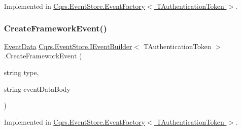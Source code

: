 Implemented in \hyperlink{classCqrs_1_1EventStore_1_1EventFactory_a91394437675f3185d2105c6a79f7b5aa}{Cqrs.\+Event\+Store.\+Event\+Factory$<$ T\+Authentication\+Token $>$}.

\mbox{\label{interfaceCqrs_1_1EventStore_1_1IEventBuilder_a8e3df7af1f54ac873d1a768b78b82c6d}} 
\subsubsection{\texorpdfstring{Create\+Framework\+Event()}{CreateFrameworkEvent()}\hspace{0.1cm}{\footnotesize\ttfamily [4/4]}}
{\footnotesize\ttfamily \hyperlink{classCqrs_1_1Events_1_1EventData}{Event\+Data} \hyperlink{interfaceCqrs_1_1EventStore_1_1IEventBuilder}{Cqrs.\+Event\+Store.\+I\+Event\+Builder}$<$ T\+Authentication\+Token $>$.Create\+Framework\+Event (\begin{DoxyParamCaption}\item[{string}]{type,  }\item[{string}]{event\+Data\+Body }\end{DoxyParamCaption})}



Implemented in \hyperlink{classCqrs_1_1EventStore_1_1EventFactory_a9e04e262a8af8f60bdde7b4bf3eafebb}{Cqrs.\+Event\+Store.\+Event\+Factory$<$ T\+Authentication\+Token $>$}.

